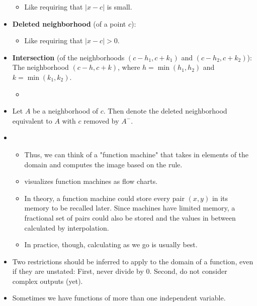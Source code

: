 \documentclass[../main.tex]{subfiles}
\begin{document}
\begin{itemize}
    \begin{itemize}
        \item Like requiring that $|x-c|$ is small.
    \end{itemize}
    \item \textbf{Deleted neighborhood} (of a point $c$): 
    \begin{itemize}
        \item Like requiring that $|x-c|>0$.
    \end{itemize}
    \item \textbf{Intersection} (of the neighborhoods $(c-h_1,c+k_1)$ and $(c-h_2,c+k_2)$): The neighborhood $(c-h,c+k)$, where $h=\min(h_1,h_2)$ and $k=\min(k_1,k_2)$.
    \begin{itemize}
        \item {}
    \end{itemize}
    \item Let $A$ be a neighborhood of $c$. Then denote the deleted neighborhood equivalent to $A$ with $c$ removed by $A^-$.
    \item {}
    \begin{itemize}
        \item Thus, we can think of a "function machine" that takes in elements of the domain and computes the image based on the rule.
        \item \textcite{bib:Thomas} visualizes function machines as flow charts.
        \item In theory, a function machine could store every pair $(x,y)$ in its memory to be recalled later. Since machines have limited memory, a fractional set of pairs could also be stored and the values in between calculated by interpolation.
        \item In practice, though, calculating as we go is usually best.
    \end{itemize}
    \item Two restrictions should be inferred to apply to the domain of a function, even if they are unstated: First, never divide by 0. Second, do not consider complex outputs (yet).
    \item Sometimes we have functions of more than one independent variable.

\end{itemize}
\end{document}
